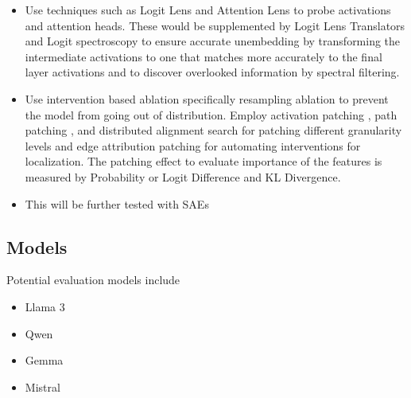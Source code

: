 \documentclass[11pt]{article}
\begin{document}
\begin{itemize}
    
    \item 
    Use techniques such as Logit Lens \citep{nostalgebraist2020} and 
    Attention Lens \citep{sakarvadia2023attentionlenstoolmechanistically} 
    to probe activations and attention heads. 
    These would be supplemented by Logit Lens Translators 
    \citep{yom-din-etal-2024-jump, belrose2025elicitinglatentpredictionstransformers} 
    and Logit spectroscopy \citep{cancedda-2024-spectral} to ensure accurate 
    unembedding by transforming the intermediate activations to one 
    that matches more accurately to the final layer activations and to discover
    overlooked information by spectral filtering.

    \item 
    Use intervention based ablation \citep{chan2022causal} specifically 
    resampling ablation to prevent the model from going out of distribution.
    Employ activation patching \citep{3600270.3601532}, path patching 
    \citep{wang2022interpretability}, and distributed alignment search 
    \citep{geiger2024findingalignmentsinterpretablecausal} for patching different
    granularity levels and edge attribution patching for automating interventions 
    for localization. 
    The patching effect to evaluate importance of the features is measured by
    Probability or Logit Difference and KL Divergence.

    \item 
    This will be further tested with SAEs \citep{cunningham2023sparse}


\end{itemize}

\subsection{Models}

Potential evaluation models include

\begin{itemize}

\item Llama 3

\item Qwen

\item Gemma

\item Mistral

\end{itemize}
\end{document}
